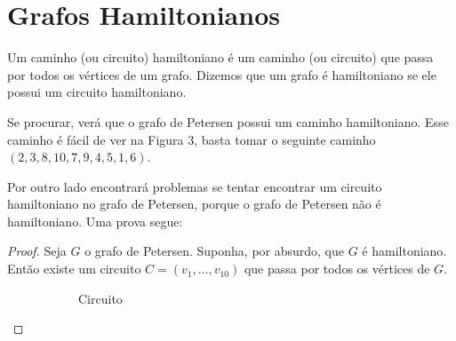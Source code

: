 \documentclass[11pt,a4paper]{exam}
\begin{document}
\section{Grafos Hamiltonianos}
Um caminho (ou circuito) hamiltoniano é um caminho (ou circuito) que
passa por todos os vértices de um grafo. Dizemos que um grafo é
hamiltoniano se ele possui um circuito hamiltoniano.\par
Se procurar, verá que o grafo de Petersen possui um caminho
hamiltoniano. Esse caminho é fácil de ver na Figura 3, basta tomar o
seguinte caminho $(2,3,8,10,7,9,4,5,1,6)$.\par
Por outro lado encontrará problemas se tentar encontrar um circuito
hamiltoniano no grafo de Petersen, porque o grafo de Petersen não é
hamiltoniano. Uma prova segue:
\begin{proof}
    Seja $G$ o grafo de Petersen. Suponha, por absurdo, que $G$ é hamiltoniano.
    Então existe um circuito $C = (v_1, \dots, v_{10})$ que passa por
    todos os vértices de $G$.
    \begin{figure}[H]
    \begin{subfigure}{.5\textwidth}
        \centering
        \caption{Circuito}
    \end{subfigure}
     \begin{subfigure}{.5\textwidth}
        \centering
\end{subfigure}
\end{figure}
\end{proof}
\end{document}
